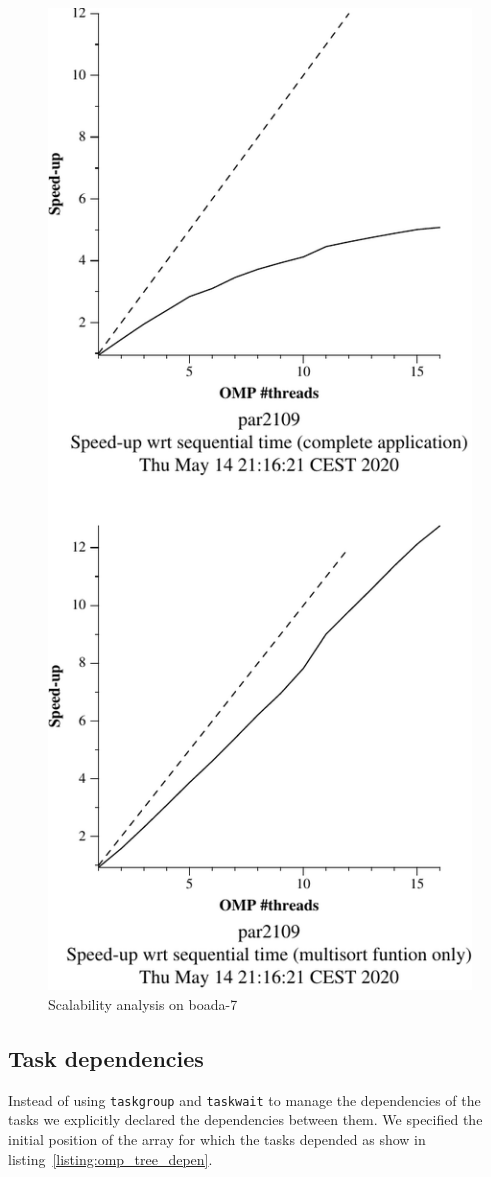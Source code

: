 \begin{figure}[H]
\begin{minipage}{0.5\textwidth}
        \includegraphics[width=0.7\linewidth]{plots/new-omp-tree-cutoff_boada7-crop.pdf}
        \caption{Scalability analysis on boada-7}
        \label{fig:cutoffboada7} 
    \end{minipage}
\end{figure}

\pagebreak
\subsection{Task dependencies}

Instead of using \texttt{taskgroup} and \texttt{taskwait} to manage the dependencies of the tasks we
explicitly declared the dependencies between them. We specified the initial position of the array for which
the tasks depended as show in listing~\ref{listing:omp_tree_depen}.

